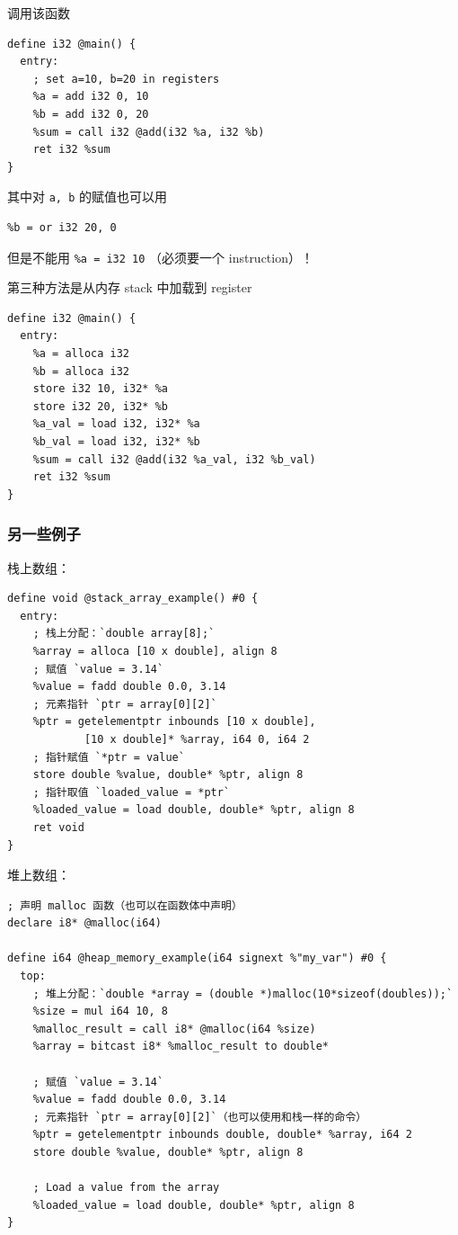 调用该函数
\begin{lstlisting}[language=none]
define i32 @main() {
  entry:
    ; set a=10, b=20 in registers
    %a = add i32 0, 10
    %b = add i32 0, 20
    %sum = call i32 @add(i32 %a, i32 %b)
    ret i32 %sum
}
\end{lstlisting}

其中对 \verb`a, b` 的赋值也可以用
\begin{lstlisting}[language=none]
%a = or i32 10, 0
%b = or i32 20, 0
\end{lstlisting}
但是不能用 \verb`%a = i32 10` （必须要一个 instruction）！

第三种方法是从内存 stack 中加载到 register
\begin{lstlisting}[language=none]
define i32 @main() {
  entry:
    %a = alloca i32
    %b = alloca i32
    store i32 10, i32* %a
    store i32 20, i32* %b
    %a_val = load i32, i32* %a
    %b_val = load i32, i32* %b
    %sum = call i32 @add(i32 %a_val, i32 %b_val)
    ret i32 %sum
}
\end{lstlisting}

\subsubsection{另一些例子}
栈上数组：
\begin{lstlisting}[language=none]
define void @stack_array_example() #0 {
  entry:
    ; 栈上分配：`double array[8];`
    %array = alloca [10 x double], align 8
    ; 赋值 `value = 3.14`
    %value = fadd double 0.0, 3.14
    ; 元素指针 `ptr = array[0][2]`
    %ptr = getelementptr inbounds [10 x double],
            [10 x double]* %array, i64 0, i64 2
    ; 指针赋值 `*ptr = value`
    store double %value, double* %ptr, align 8
    ; 指针取值 `loaded_value = *ptr`
    %loaded_value = load double, double* %ptr, align 8
    ret void
}
\end{lstlisting}

堆上数组：
\begin{lstlisting}[language=none]
; 声明 malloc 函数（也可以在函数体中声明）
declare i8* @malloc(i64)

define i64 @heap_memory_example(i64 signext %"my_var") #0 {
  top:
    ; 堆上分配：`double *array = (double *)malloc(10*sizeof(doubles));`
    %size = mul i64 10, 8
    %malloc_result = call i8* @malloc(i64 %size)
    %array = bitcast i8* %malloc_result to double*

    ; 赋值 `value = 3.14`
    %value = fadd double 0.0, 3.14
    ; 元素指针 `ptr = array[0][2]`（也可以使用和栈一样的命令）
    %ptr = getelementptr inbounds double, double* %array, i64 2
    store double %value, double* %ptr, align 8

    ; Load a value from the array
    %loaded_value = load double, double* %ptr, align 8
}
\end{lstlisting}

